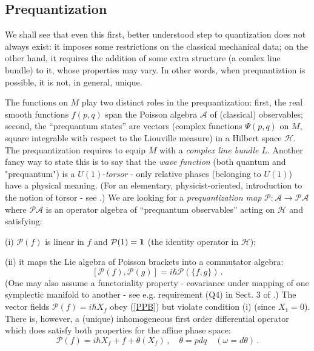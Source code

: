 \smallskip

\subsection{Prequantization}

We shall see that even this first, better understood step to quantization does
not always exist: it imposes some restrictions on the classical mechanical data; on
the other hand, it requires the addition of some extra structure (a comlex line
bundle) to it, whose properties may vary. In other words, when prequantiztion is
possible, it is not, in general, unique.

The functions on $M$ play two distinct roles in the prequantization: first, the real
smooth functions $f(p, q)$ span the Poisson algebra $\mathcal{A}$ of (classical) observables;
second, the ``prequantum states'' are vectors (complex functions $\Psi(p, q)$ on $M$,
square integrable with respect to the Liouville measure) in a Hilbert space $\mathcal{H}$.
The prequantization requires to equip $M$ with a {\it complex line bundle $L$}. Another fancy
way to state this is to say that the {\it wave function} (both quantum and "prequantum") is
a $U(1)$-{\it torsor} - only relative phases (belonging to $U(1)$) have a physical meaning.
(For an elementary, physicist-oriented, introduction to the notion of torsor - see
\cite{B09}.)  We are looking for a {\it prequantization map} $\mathcal{P}: \mathcal{A} \rightarrow
\mathcal{P}\mathcal{A}$ where $\mathcal{P}\mathcal{A}$ is an operator algebra of ``prequantum observables''
acting on $\mathcal{H}$ and satisfying:

(i) ${\mathcal P}(f)$ is linear in $f$ and ${\mathcal P}(1) = {\bf 1}$
(the identity operator in ${\mathcal H}$);

(ii) it maps the Lie algebra of Poisson brackets into a commutator algebra:
\begin{equation}
\label{PPB}
 [{\mathcal P}(f),{\mathcal P}(g)] = i \hbar {\mathcal P}(\{f, g\})\,.
\end{equation}
(One may also assume a functoriality property - covariance under mapping of one symplectic manifold
to another - see e.g. requirement (Q4) in Sect. 3 of \cite{AE}.) The vector fields ${\mathcal P}(f)= i \hbar
X_f$ obey (\ref{PPB}) but violate condition (i) (since $X_1 = 0$). There is, however, a (unique) inhomogeneous
first order differential operator which does satisfy both properties for the affine phase space:
\begin{equation}
 \label{P(f)}
{\mathcal P}(f) = i \hbar X_f + f + \theta(X_f)\,, \quad \theta = p dq \quad (\omega = d\theta)\,.
\end{equation}

